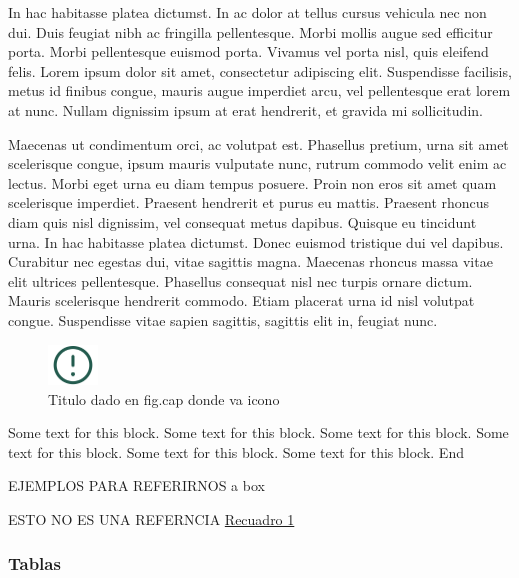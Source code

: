 \documentclass[
]{article}
\begin{document}
In hac habitasse platea dictumst. In ac dolor at tellus cursus vehicula nec non dui. Duis feugiat nibh ac fringilla pellentesque. Morbi mollis augue sed efficitur porta. Morbi pellentesque euismod porta. Vivamus vel porta nisl, quis eleifend felis. Lorem ipsum dolor sit amet, consectetur adipiscing elit. Suspendisse facilisis, metus id finibus congue, mauris augue imperdiet arcu, vel pellentesque erat lorem at nunc. Nullam dignissim ipsum at erat hendrerit, et gravida mi sollicitudin.

Maecenas ut condimentum orci, ac volutpat est. Phasellus pretium, urna sit amet scelerisque congue, ipsum mauris vulputate nunc, rutrum commodo velit enim ac lectus. Morbi eget urna eu diam tempus posuere. Proin non eros sit amet quam scelerisque imperdiet. Praesent hendrerit et purus eu mattis. Praesent rhoncus diam quis nisl dignissim, vel consequat metus dapibus. Quisque eu tincidunt urna. In hac habitasse platea dictumst. Donec euismod tristique dui vel dapibus. Curabitur nec egestas dui, vitae sagittis magna. Maecenas rhoncus massa vitae elit ultrices pellentesque. Phasellus consequat nisl nec turpis ornare dictum. Mauris scelerisque hendrerit commodo. Etiam placerat urna id nisl volutpat congue. Suspendisse vitae sapien sagittis, sagittis elit in, feugiat nunc.

\begin{figure}
\includegraphics[width=50px,style="float:left; background-color: #f5f5f5; padding-right:1em"]{images-1/important-icon} \caption{Titulo dado en fig.cap donde va icono}\label{fig:testBox}
\end{figure}

\begin{rmdcomment}
Some text for this block. Some text for this block. Some text for this
block. Some text for this block. Some text for this block. Some text for
this block. End
\end{rmdcomment}

EJEMPLOS PARA REFERIRNOS a box

ESTO NO ES UNA REFERNCIA
\protect\hyperlink{fig:testBox}{Recuadro 1}

\hypertarget{tablas}{%
\subsubsection{Tablas}\label{tablas}}
\end{document}
